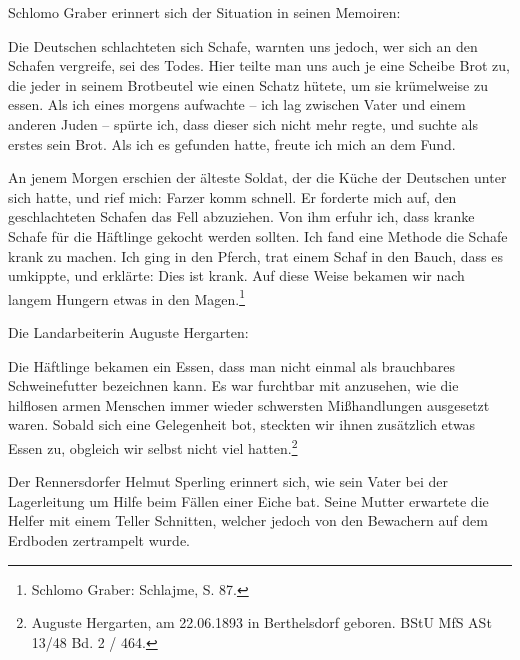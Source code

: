 \documentclass[a4paper,12pt,ngerman,
]{nisebook}
\begin{document}
Schlomo Graber erinnert sich der Situation in seinen Memoiren:
\begin{leftbar} 
Die Deutschen schlachteten sich Schafe, warnten uns jedoch, wer sich an den Schafen vergreife, sei des Todes. Hier teilte man uns auch je eine Scheibe Brot zu, die jeder in seinem Brotbeutel wie einen Schatz hütete, um sie krümelweise zu essen. Als ich eines morgens aufwachte -- ich lag zwischen Vater und einem anderen Juden -- spürte ich, dass dieser sich nicht mehr regte, und suchte als erstes sein Brot. Als ich es gefunden hatte, freute ich mich an dem Fund.

An jenem Morgen erschien der älteste Soldat, der die Küche der Deutschen unter sich hatte, und rief mich: \glqq Farzer komm schnell\grqq. Er forderte mich auf, den geschlachteten Schafen das Fell abzuziehen. Von ihm erfuhr ich, dass kranke Schafe für die Häftlinge gekocht werden sollten. Ich fand eine Methode die Schafe krank zu machen. Ich ging in den Pferch, trat einem Schaf in den Bauch, dass es umkippte, und erklärte: \glqq Dies ist krank\grqq. Auf diese Weise bekamen wir nach langem Hungern etwas in den Magen.\footnote{Schlomo Graber: Schlajme, S. 87.}
\end{leftbar}
Die Landarbeiterin Auguste Hergarten: 
\begin{leftbar} 
Die Häftlinge bekamen ein Essen, dass man nicht einmal als brauchbares Schweinefutter bezeichnen kann. Es war furchtbar mit anzusehen, wie die hilflosen armen Menschen immer wieder schwersten Mißhandlungen ausgesetzt waren. Sobald sich eine Gelegenheit bot, steckten wir ihnen zusätzlich etwas Essen zu, obgleich wir selbst nicht viel hatten.\footnote{Auguste Hergarten, am 22.06.1893 in Berthelsdorf geboren. BStU MfS ASt 13/48 Bd. 2 / 464.}
\end{leftbar}


Der Rennersdorfer Helmut Sperling erinnert sich, wie sein Vater bei der Lagerleitung um Hilfe beim Fällen einer Eiche bat. Seine Mutter erwartete die Helfer mit einem Teller Schnitten, welcher jedoch von den Bewachern auf dem Erdboden zertrampelt wurde.
\end{document}

